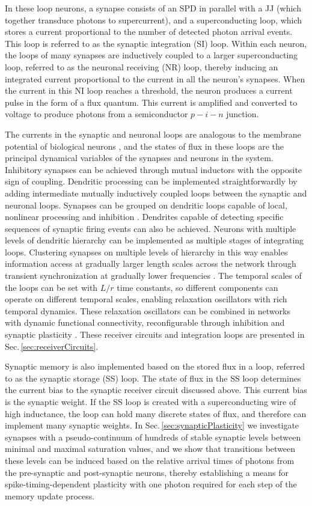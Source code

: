 \documentclass[twocolumn]{article}
\begin{document}
In these loop neurons, a synapse consists of an SPD in parallel with a JJ (which together transduce photons to supercurrent), and a superconducting loop, which stores a current proportional to the number of detected photon arrival events. This loop is referred to as the synaptic integration (SI) loop. Within each neuron, the loops of many synapses are inductively coupled to a larger superconducting loop, referred to as the neuronal receiving (NR) loop, thereby inducing an integrated current proportional to the current in all the neuron's synapses. When the current in this NI loop reaches a threshold, the neuron produces a current pulse in the form of a flux quantum. This current is amplified and converted to voltage to produce photons from a semiconductor $p-i-n$ junction.

The currents in the synaptic and neuronal loops are analogous to the membrane potential of biological neurons \cite{daab2001}, and the states of flux in these loops are the principal dynamical variables of the synapses and neurons in the system. Inhibitory synapses can be achieved through mutual inductors with the opposite sign of coupling. Dendritic processing can be implemented straightforwardly by adding intermediate mutually inductively coupled loops between the synaptic and neuronal loops. Synapses can be grouped on dendritic loops capable of local, nonlinear processing and inhibition \cite{sase2001,bu2006,robu2015}. Dendrites capable of detecting specific sequences of synaptic firing events \cite{thde2001,haah2015} can also be achieved. Neurons with multiple levels of dendritic hierarchy can be implemented as multiple stages of integrating loops. Clustering synapses on multiple levels of hierarchy in this way enables information access at gradually larger length scales across the network through transient synchronization at gradually lower frequencies \cite{stsa2000}. The temporal scales of the loops can be set with $L/r$ time constants, so different components can operate on different temporal scales, enabling relaxation oscillators with rich temporal dynamics. These relaxation oscillators can be combined in networks with dynamic functional connectivity, reconfigurable through inhibition and synaptic plasticity \cite{robu2015,fr2015}. These receiver circuits and integration loops are presented in Sec.\,\ref{sec:receiverCircuits}.

Synaptic memory is also implemented based on the stored flux in a loop, referred to as the synaptic storage (SS) loop. The state of flux in the SS loop determines the current bias to the synaptic receiver circuit discussed above. This current bias is the synaptic weight. If the SS loop is created with a superconducting wire of high inductance, the loop can hold many discrete states of flux, and therefore can implement many synaptic weights. In Sec.\,\ref{sec:synapticPlasticity} we investigate synapses with a pseudo-continuum of hundreds of stable synaptic levels between minimal and maximal saturation values, and we show that transitions between these levels can be induced based on the relative arrival times of photons from the pre-synaptic and post-synaptic neurons, thereby establishing a means for spike-timing-dependent plasticity with one photon required for each step of the memory update process. 
\end{document}
